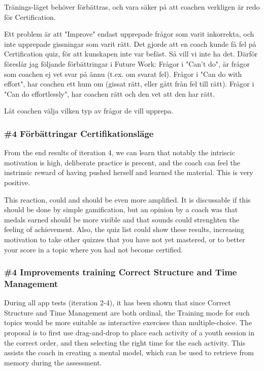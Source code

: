 Tränings-läget behöver förbättras, och vara säker på att coachen verkligen är redo för Certification.

Ett problem är att "Improve" endast upprepade frågor som varit inkorrekta, och inte upprepade gissningar som varit rätt. Det gjorde att en coach kunde få fel på Certification quiz, för att kunskapen inte var befäst. Så vill vi inte ha det. Därför föreslår jag följande förbättringar i Future Work: Frågor i "Can't do", är frågor som coachen ej vet svar på ännu (t.ex. om svarat fel).
Frågor i "Can do with effort", har coachen ett hum om (gissat rätt, eller gått från fel till rätt).
Frågor i "Can do effortlessly", har coachen rätt och den vet att den har rätt.

Låt coachen välja vilken typ av frågor de vill upprepa.

\subsubsection{\#4 Förbättringar Certifikationsläge}

From the end results of iteration 4, we can learn that notably the intriscic motivation is high, deliberate practice is precent, and the coach can feel the instrinsic reward of having pushed herself and learned the material. This is very positive.

This reaction, could and should be even more amplified. It is discussable if this should be done by simple gamification, but an opinion by a coach was that medals earned should be more visible and that sounds could strenghten the feeling of achievement. Also, the quiz list could show these results, increasing motivation to take other quizzes that you have not yet mastered, or to better your score in a topic where you had not become certified.

\subsubsection{\#4 Improvements training Correct Structure and Time Management}
During all app tests (iteration 2-4), it has been shown that since Correct Structure and Time Management are both ordinal, the Training mode for such topics would be more suitable as interactive exercises than multiple-choice. The proposal is to first use drag-and-drop to place each activity of a youth session in the correct order, and then selecting the right time for the each activity. This assists the coach in creating a mental model, which can be used to retrieve from memory during the assessment.

